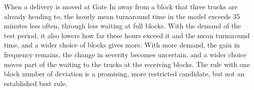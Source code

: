 When a delivery is moved at Gate In away from a block that three trucks are already
heading to, the hourly mean turnaround time in the model exceeds 35 minutes less often,
through less waiting at full blocks. With the
demand of the test period, it also lowers how far these hours exceed it and the mean
turnaround time, and a wider choice of blocks gives more. With more demand, the gain
in frequency remains, the change in severity becomes uncertain, and a wider choice
moves part of the waiting to the trucks at the receiving blocks. The rule with one
block number of deviation is a promising, more restricted candidate, but not an
established best rule.

